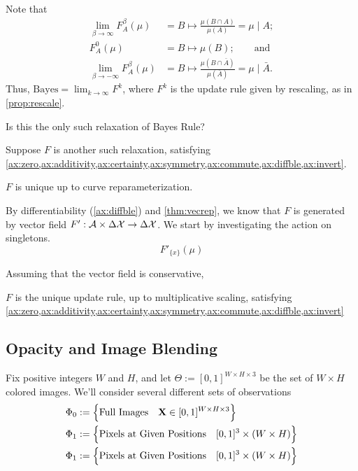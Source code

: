 \documentclass{article}
\begin{document}
Note that
\begin{align*}
\lim_{\beta\to\infty} F^\beta_A(\mu) &= B \mapsto \frac{\mu(B \cap A)}{\mu(A)}
   = \mu \mid A; \\
 F^0_A(\mu) &= B \mapsto \mu(B); \qquad\text{and}\\
\lim_{\beta\to-\infty} F^\beta_A(\mu) &= B \mapsto \frac{\mu(B \cap \bar A)}{\mu(\bar A)}
      = \mu \mid \bar A.
\end{align*}
Thus, $\mathrm{Bayes} = \lim_{k \to \infty} F^{k}$, where $F^k$ is the update rule given by rescaling, as in \cref{prop:rescale}.



\begin{wip}
Is this the only such relaxation of Bayes Rule?

Suppose $F$ is another such relaxation, satisfying \cref{ax:zero,ax:additivity,ax:certainty,ax:symmetry,ax:commute,ax:diffble,ax:invert}.

\begin{prop}
    $F$ is unique up to curve reparameterization.
\end{prop}

By differentiability (\cref{ax:diffble}) and \cref{thm:vecrep}, we know that $F$ is generated by vector field $F' : \mathcal A \times \Delta\mathcal X \to \Delta\mathcal X$.
We start by investigating the action on singletons.
\[
    F'_{\{x\}}(\mu)
\]

Assuming that the vector field is conservative,

\begin{conj}
    $F$ is the unique update rule, up to multiplicative scaling, satisfying
    \cref{ax:zero,ax:additivity,ax:certainty,ax:symmetry,ax:commute,ax:diffble,ax:invert}
\end{conj}
\end{wip}




\subsection{Opacity and Image Blending}
Fix positive integers $W$ and $H$, and
let $\Theta := [0,1]^{W\times H\times 3}$ be the set of $W\times H$ colored images.
%
We'll consider several different sets of observations
\begin{align*}
     \Phi_0 &:= \Big\{ \text{Full Images}\quad \mathbf{X} \in [0,1]^{W \times H \times 3} \Big\} \\
     \Phi_1 &:= \Big\{ \text{Pixels at Given Positions}\quad [0,1]^3 \times (W \times H) \Big\} \\
     \Phi_1 &:= \Big\{ \text{Pixels at Given Positions}\quad [0,1]^3 \times (W \times H) \Big\} \\
\end{align*}
\end{document}
